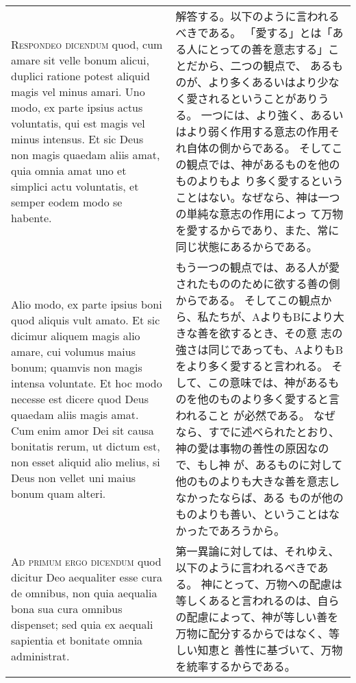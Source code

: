 \documentclass[10pt]{jsarticle} %
\begin{document}
\begin{longtable}{p{21em}p{21em}}
\\


{\scshape Respondeo dicendum} quod, cum amare sit velle
bonum alicui, duplici ratione potest aliquid magis vel minus amari. Uno
modo, ex parte ipsius actus voluntatis, qui est magis vel minus
intensus. Et sic Deus non magis quaedam aliis amat, quia omnia amat uno
et simplici actu voluntatis, et semper eodem modo se habente. 


&

解答する。以下のように言われるべきである。
「愛する」とは「ある人にとっての善を意志する」ことだから、二つの観点で、
あるものが、より多くあるいはより少なく愛されるということがありうる。
一つには、より強く、あるい
 はより弱く作用する意志の作用それ自体の側からである。
そしてこの観点では、神があるものを他のものよりもよ
 り多く愛するということはない。なぜなら、神は一つの単純な意志の作用によっ
 て万物を愛するからであり、また、常に同じ状態にあるからである。


\\

Alio modo,
ex parte ipsius boni quod aliquis vult amato. Et sic dicimur aliquem
magis alio amare, cui volumus maius bonum; quamvis non magis intensa
voluntate. Et hoc modo necesse est dicere quod Deus quaedam aliis magis
amat. Cum enim amor Dei sit causa bonitatis rerum, ut dictum est, non
esset aliquid alio melius, si Deus non vellet uni maius bonum quam
alteri.

&



もう一つの観点では、ある人が愛されたもののために欲する善の側からである。
そしてこの観点から、私たちが、AよりもBにより大きな善を欲するとき、その意
 志の強さは同じであっても、AよりもBをより多く愛すると言われる。
そして、この意味では、神があるものを他のものより多く愛すると言われること
 が必然である。
なぜなら、すでに述べられたとおり、神の愛は事物の善性の原因なので、もし神
 が、あるものに対して他のものよりも大きな善を意志しなかったならば、ある
 ものが他のものよりも善い、ということはなかったであろうから。


\\


{\scshape Ad primum ergo dicendum} quod dicitur Deo
aequaliter esse cura de omnibus, non quia aequalia bona sua cura omnibus
dispenset; sed quia ex aequali sapientia et bonitate omnia administrat.


&

第一異論に対しては、それゆえ、以下のように言われるべきである。
神にとって、万物への配慮は等しくあると言われるのは、自ら
 の配慮によって、神が等しい善を万物に配分するからではなく、等しい知恵と
 善性に基づいて、万物を統率するからである。



\end{longtable}
\end{document}
